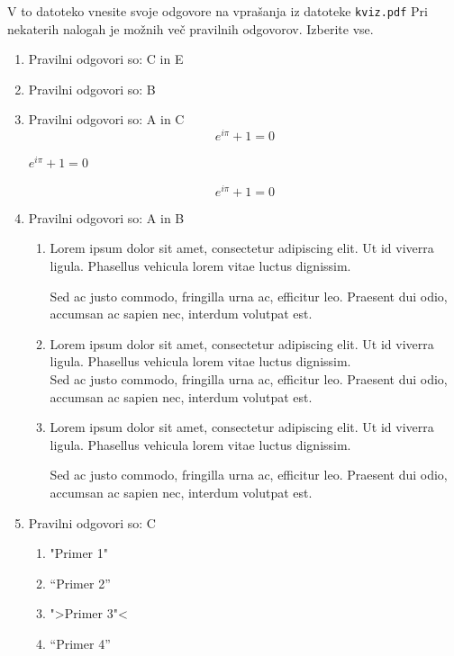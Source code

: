 \documentclass[11pt]{article}
\begin{document}
V to datoteko vnesite svoje odgovore na vprašanja iz datoteke \texttt{kviz.pdf}
Pri nekaterih nalogah je možnih več pravilnih odgovorov. Izberite vse.

\begin{enumerate}
    \item Pravilni odgovori so: %
    C in E
    \item Pravilni odgovori so: %
    B
    \item Pravilni odgovori so:  %
    A in C
      \[ e^{i \pi} + 1 = 0 \]
      \begin{center}
          \( e^{i \pi} + 1 = 0 \)
      \end{center}
      \begin{equation*}
          e^{i \pi} + 1 = 0
      \end{equation*}

    \item Pravilni odgovori so: A in B %
        \begin{enumerate}
            \item {
Lorem ipsum dolor sit amet, consectetur adipiscing 
elit. Ut id viverra ligula. Phasellus vehicula lorem 
vitae luctus dignissim. 
                
Sed ac justo commodo, fringilla urna ac, efficitur 
leo. Praesent dui odio, accumsan ac sapien nec, 
interdum volutpat est. 
            }
            \item {
Lorem ipsum dolor sit amet, consectetur adipiscing 
elit. Ut id viverra ligula. Phasellus vehicula lorem 
vitae luctus dignissim. \\
Sed ac justo commodo, fringilla urna ac, efficitur 
leo. Praesent dui odio, accumsan ac sapien nec, 
interdum volutpat est.             }
            \item {
Lorem ipsum dolor sit amet, consectetur adipiscing 
elit. Ut id viverra ligula. Phasellus vehicula lorem 
vitae luctus dignissim. \par
Sed ac justo commodo, fringilla urna ac, efficitur 
leo. Praesent dui odio, accumsan ac sapien nec, 
interdum volutpat est.             }
        \end{enumerate}
    
      \item Pravilni odgovori so: C %
        \begin{enumerate}
          \item "Primer 1"
          \item ``Primer 2''
          \item ">Primer 3"<
          \item "`Primer 4"'
        \end{enumerate}


\end{enumerate}
\end{document}
